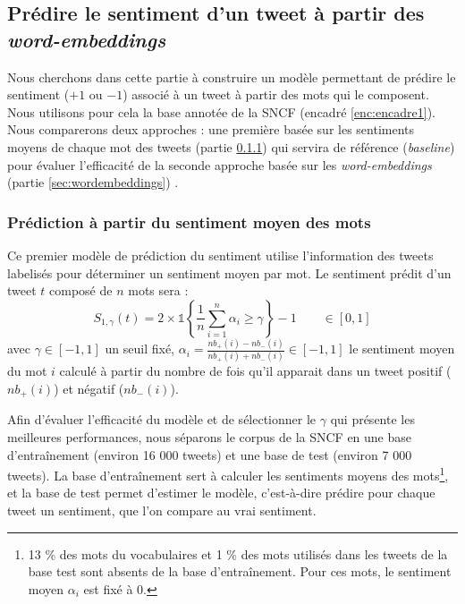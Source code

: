 \documentclass[11pt,french,french]{article}
\let\rmarkdownfootnote\footnote%
\def\footnote{\protect\rmarkdownfootnote}
\begin{document}
\hypertarget{pruxe9dire-le-sentiment-dun-tweet-uxe0-partir-des-word-embeddings}{%
\subsection{\texorpdfstring{Prédire le sentiment d'un tweet à partir des \emph{word-embeddings}}{Prédire le sentiment d'un tweet à partir des word-embeddings}}\label{pruxe9dire-le-sentiment-dun-tweet-uxe0-partir-des-word-embeddings}}

Nous cherchons dans cette partie à construire un modèle permettant de prédire le sentiment (\(+1\) ou \(-1\)) associé à un tweet à partir des mots qui le composent.
Nous utilisons pour cela la base annotée de la SNCF (encadré \ref{enc:encadre1}).
Nous comparerons deux approches : une première basée sur les sentiments moyens de chaque mot des tweets (partie \ref{sec:sentiments}) qui servira de référence (\emph{baseline}) pour évaluer l'efficacité de la seconde approche basée sur les \emph{word-embeddings} (partie \ref{sec:wordembeddings}) .

\hypertarget{sec:sentiments}{%
\subsubsection{Prédiction à partir du sentiment moyen des mots}\label{sec:sentiments}}

Ce premier modèle de prédiction du sentiment utilise l'information des tweets labelisés pour déterminer un sentiment moyen par mot.
Le sentiment prédit d'un tweet \(t\) composé de \(n\) mots sera :
\[S_{1,\gamma}(t) = 2 \times \mathds{1}\left\{ \frac{1}{n} \sum \limits_{i=1}^n \alpha_i \geq \gamma\right\} - 1 \qquad \in [0,1]\]
avec \(\gamma \in [-1,1]\) un seuil fixé, \(\alpha_i = \frac{nb_+(i) - nb_-(i)}{nb_+(i) + nb_-(i)} \in [-1,1]\) le sentiment moyen du mot \(i\) calculé à partir du nombre de fois qu'il apparait dans un tweet positif (\(nb_+(i)\)) et négatif (\(nb_-(i)\)).

Afin d'évaluer l'efficacité du modèle et de sélectionner le \(\gamma\) qui présente les meilleures performances, nous séparons le corpus de la SNCF en une base d'entraînement (environ 16 000 tweets) et une base de test (environ 7 000 tweets). La base d'entraînement sert à calculer les sentiments moyens des mots\footnote{13 \% des mots du vocabulaires et 1 \% des mots utilisés dans les tweets de la base test sont absents de la base d'entraînement. Pour ces mots, le sentiment moyen \(\alpha_i\) est fixé à 0.}, et la base de test permet d'estimer le modèle, c'est-à-dire prédire pour chaque tweet un sentiment, que l'on compare au vrai sentiment.
\end{document}
